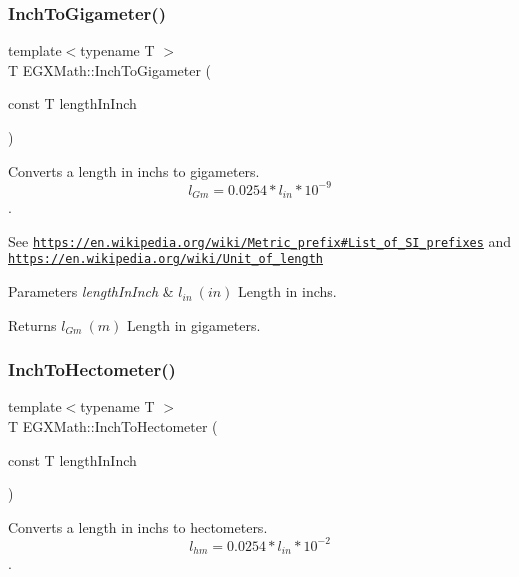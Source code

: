 \subsubsection{\texorpdfstring{Inch\+To\+Gigameter()}{InchToGigameter()}}
{\footnotesize\ttfamily template$<$typename T $>$ \\
T E\+G\+X\+Math\+::\+Inch\+To\+Gigameter (\begin{DoxyParamCaption}\item[{const T}]{length\+In\+Inch }\end{DoxyParamCaption})}



Converts a length in inchs to gigameters. \[ l_{Gm}=0.0254 * l_{in} * 10^{-9} \]. 

See \href{https://en.wikipedia.org/wiki/Metric_prefix#List_of_SI_prefixes}{\tt https\+://en.\+wikipedia.\+org/wiki/\+Metric\+\_\+prefix\#\+List\+\_\+of\+\_\+\+S\+I\+\_\+prefixes} and \href{https://en.wikipedia.org/wiki/Unit_of_length}{\tt https\+://en.\+wikipedia.\+org/wiki/\+Unit\+\_\+of\+\_\+length} 
\begin{DoxyParams}{Parameters}
{\em length\+In\+Inch} & $ l_{in}\ (in)$ Length in inchs. \\
\hline
\end{DoxyParams}
\begin{DoxyReturn}{Returns}
$ l_{Gm}\ (m)$ Length in gigameters. 
\end{DoxyReturn}
\mbox{\label{group___e_g_x_math-_conversions-_length_conversions-_imperial-_inch-_s_i_ga2a991ddc6bcdb83749833f8075eb8cdb}} 
\subsubsection{\texorpdfstring{Inch\+To\+Hectometer()}{InchToHectometer()}}
{\footnotesize\ttfamily template$<$typename T $>$ \\
T E\+G\+X\+Math\+::\+Inch\+To\+Hectometer (\begin{DoxyParamCaption}\item[{const T}]{length\+In\+Inch }\end{DoxyParamCaption})}



Converts a length in inchs to hectometers. \[ l_{hm}=0.0254 * l_{in} * 10^{-2} \]. 

